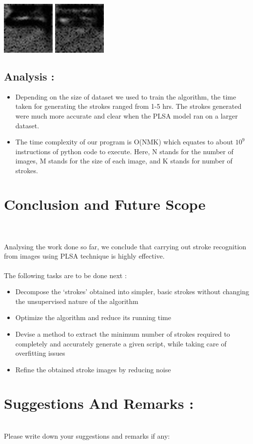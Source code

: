 \documentclass[10pt]{article}
\begin{document}
\begin{center}
				\includegraphics{stro8.jpg}
				\includegraphics{stro9.jpg}
			\end{center}
		\subsection{Analysis :}
			\begin{itemize}
				\item 
				Depending on the size of dataset we used to train the algorithm, the time taken for generating the strokes ranged from 1-5 hrs. The strokes generated were much more accurate and clear when the PLSA model ran on a larger dataset.
				\item
				The time complexity of our program is O(NMK) which equates to about $10^{9}$ instructions of python code to execute. Here, N stands for the number of images, M stands for the size of each image, and K stands for number of strokes.
			\end{itemize}
	\newpage
	\section{Conclusion and Future Scope}
		\hrulefill \\\\
		Analysing the work done so far, we conclude that carrying out stroke recognition from images using PLSA technique is highly effective.\\\\The following tasks are to be done next :
		\begin{itemize}
			\item 
			Decompose the ‘strokes’ obtained into simpler, basic strokes without changing the unsupervised nature of the algorithm
			\item
			Optimize the algorithm and reduce its running time
			\item
			Devise a method to extract the minimum number of strokes required to completely and accurately generate a given script, while taking care of overfitting issues
			\item
			Refine the obtained stroke images by reducing noise
		\end{itemize}
	\newpage
	\printbibliography
	\newpage
	\section{Suggestions And Remarks :}
		\hrulefill\\
		\Large Please write down your suggestions and remarks if any:	
\end{document}
